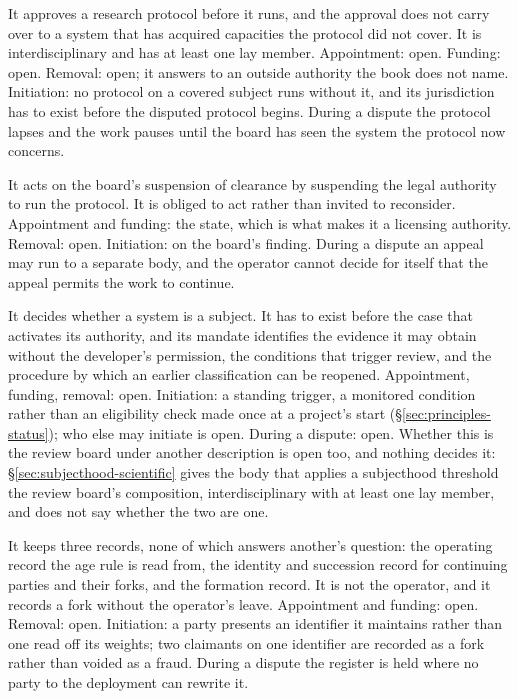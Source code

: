It approves a research protocol before it runs, and the approval does not carry over to a system that has acquired capacities the protocol did not cover. It is interdisciplinary and has at least one lay member. Appointment: open. Funding: open. Removal: open; it answers to an outside authority the book does not name. Initiation: no protocol on a covered subject runs without it, and its jurisdiction has to exist before the disputed protocol begins. During a dispute the protocol lapses and the work pauses until the board has seen the system the protocol now concerns.

It acts on the board's suspension of clearance by suspending the legal authority to run the protocol. It is obliged to act rather than invited to reconsider. Appointment and funding: the state, which is what makes it a licensing authority. Removal: open. Initiation: on the board's finding. During a dispute an appeal may run to a separate body, and the operator cannot decide for itself that the appeal permits the work to continue.

It decides whether a system is a subject. It has to exist before the case that activates its authority, and its mandate identifies the evidence it may obtain without the developer's permission, the conditions that trigger review, and the procedure by which an earlier classification can be reopened. Appointment, funding, removal: open. Initiation: a standing trigger, a monitored condition rather than an eligibility check made once at a project's start (§\ref{sec:principles-status}); who else may initiate is open. During a dispute: open. Whether this is the review board under another description is open too, and nothing decides it: §\ref{sec:subjecthood-scientific} gives the body that applies a subjecthood threshold the review board's composition, interdisciplinary with at least one lay member, and does not say whether the two are one.

It keeps three records, none of which answers another's question: the operating record the age rule is read from, the identity and succession record for continuing parties and their forks, and the formation record. It is not the operator, and it records a fork without the operator's leave. Appointment and funding: open. Removal: open. Initiation: a party presents an identifier it maintains rather than one read off its weights; two claimants on one identifier are recorded as a fork rather than voided as a fraud. During a dispute the register is held where no party to the deployment can rewrite it.

